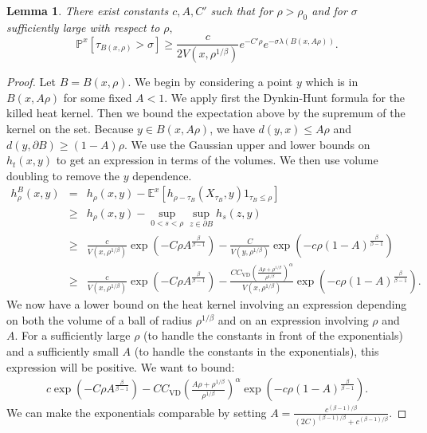 \documentclass[letterpaper,oneside,english]{amsart}
\newtheorem{lem}{Lemma}
\begin{document}
\begin{lem}
\label{lem:LBlemma} There exist constants $c, A, C'$ such that for $\rho > \rho_0$  and for $\sigma$ sufficiently large with respect to $\rho,$ \[
\mathbb{P}^{x}\left[\tau_{B(x,\rho)}>\sigma\right]
\ge
\frac{c}{2V(x,\rho^{1/\beta})} e^{-C'\rho}
e^{-\sigma\lambda(B(x, A\rho))}.
\]

\end{lem}
\begin{proof} 
Let $B=B(x,\rho).$   We begin by considering a point $y$ which is in $B(x, A\rho)$ for some fixed $A<1$.  We apply first the Dynkin-Hunt formula for the killed heat kernel.  Then we bound the expectation above by the supremum of the kernel on the set.  Because $y \in B(x, A\rho)$, we have $d(y,x) \le A\rho$ and $d(y,{\partial} B) \ge (1-A)\rho$.  We use the Gaussian upper and lower bounds on $h_t(x,y)$ to get an expression in terms of the volumes.  We then use volume doubling to remove the $y$ dependence. 
\begin{eqnarray*}
  h_{\rho}^B(x,y) 
&= &  
h_{\rho}(x,y) - \mathbb{E}^x[h_{\rho-\tau_B}(X_{\tau_B},y)1_{\tau_B\le \rho} ]
\\
&\ge &  
h_{\rho}(x,y) - \sup_{0<s<\rho}\sup_{z\in {\partial} B} h_{s}(z,y)
\\
&\ge & 
\frac{c}{V(x,\rho^{1/\beta})}\exp\left(-C \rho A^{\frac{\beta}{\beta-1}}\right)
- 
\frac{C}{
V(y,\rho^{1/\beta})
}\exp\left(-c\rho(1-A)^{\frac{\beta}{\beta-1}}
\right)\\
&\ge & 
\frac{c}{V(x,\rho^{1/\beta})}\exp\left(- C \rho A^{\frac{\beta}{\beta-1}}\right)
- 
\frac{C C_{\mathrm{VD}}\left(\frac{A\rho+\rho^{1/\beta}}{\rho^{1/\beta}}\right)^{\alpha}}{
V(x,\rho^{1/\beta})
}\exp\left(-c\rho(1-A)^{\frac{\beta}{\beta-1}}
\right).
\end{eqnarray*}
We now have a lower bound on the heat kernel involving an expression depending on both the volume of a ball of radius $\rho^{1/\beta}$ and on an expression involving $\rho$ and $A$.  For a sufficiently large $\rho$ (to handle the constants in front of the exponentials) and a sufficiently small $A$ (to handle the constants in the exponentials), this expression will be positive. We want to bound:
\begin{eqnarray*}
c\exp\left(-C\rho A^{\frac{\beta}{\beta-1}}\right)
- 
C C_{\mathrm{VD}}\left(\frac{A\rho+\rho^{1/\beta}}{\rho^{1/\beta}}\right)^{\alpha}
\exp\left(-c\rho\left(1-A\right)^{\frac{\beta}{\beta-1}}
\right).
\end{eqnarray*}
We can make the exponentials comparable by setting $A= \frac{c^{(\beta-1)/\beta}}{(2C)^{(\beta-1)/\beta} +c^{(\beta-1)/\beta}}$.  

\end{proof}
\end{document}
